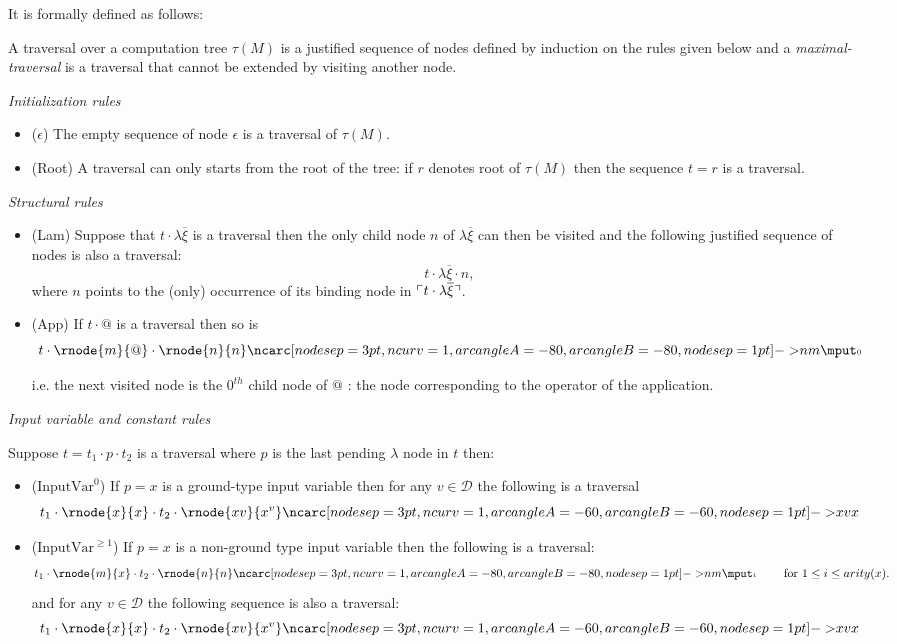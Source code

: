 It is formally defined as follows:

\begin{dfn}[Traversal]
\label{def:traversal} A traversal over a computation tree $\tau(M)$
is a justified sequence of nodes defined by induction on the rules
given below and a \emph{maximal-traversal} is a traversal that cannot be
extended by visiting another node.

\emph{Initialization rules}
\begin{itemize}
\item ($\epsilon$) The empty sequence of node $\epsilon$ is a traversal of $\tau(M)$.

\item (Root) A traversal can only starts from the root of the tree: if $r$ denotes root of $\tau(M)$ then the sequence $t = r$
is a traversal.
\end{itemize}


\emph{Structural rules}
\begin{itemize}
\item (Lam) Suppose that $t \cdot \lambda \overline{\xi}$ is a traversal then the only child
node $n$ of $\lambda \overline{\xi}$ can then be visited and the
following justified sequence of nodes is also a traversal:
$$t \cdot \lambda \overline{\xi} \cdot n,$$
where $n$ points to the (only) occurrence of its binding node in $\ulcorner t \cdot \lambda \overline{\xi} \urcorner$.

\item (App) If $t \cdot @$ is a traversal then so is
$$t \cdot \rnode{m}{@} \cdot
\rnode{n}{n} \bkptra[nodesep=1pt]{80}{n}{m} \bklabelb{0}
$$

i.e. the next visited node is the $0^{th}$ child node of $@$ : the
node corresponding to the operator of the application.
\end{itemize}

\emph{Input variable and constant rules}

Suppose $t = t_1 \cdot p \cdot t_2$ is a traversal where $p$ is the last pending $\lambda$ node in $t$ then:
\begin{itemize}
\item ($\mbox{InputVar}^0$) If $p = x$ is a ground-type input variable then for any $v \in \mathcal{D}$
the following is a traversal
$$t_1 \cdot \rnode{x}{x} \cdot t_2 \cdot \rnode{xv}{x^v}
\bkptra[nodesep=1pt]{60}{xv}{x}$$


\item ($\mbox{InputVar}^{\geq 1}$) If $p = x$ is a non-ground type input variable then the following is a traversal:
$$t_1 \cdot \rnode{m}{x} \cdot t_2 \cdot
\rnode{n}{n} \bkptra[nodesep=1pt]{80}{n}{m} \bklabelb{i} \qquad
\mbox{ for } 1 \leq i \leq arity(x).$$
and for any $v\in \mathcal{D}$ the following sequence is also a traversal:
$$t_1 \cdot \rnode{x}{x} \cdot t_2 \cdot \rnode{xv}{x^v}
\bkptra[nodesep=1pt]{60}{xv}{x}$$


\end{itemize}
\end{dfn}
